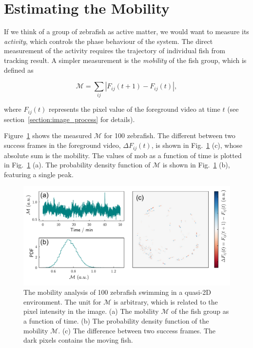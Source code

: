 \documentclass[11pt,twoside]{report}
\begin{document}
\section{Estimating the Mobility}


If we think of a group of zebrafish as active matter, we would want to measure its \emph{activity}, which controls the phase behaviour of the system. The direct measurement of the activity requires the trajectory of individual fish from tracking result. A simpler measurement is the \emph{mobility} of the fish group, which is defined as

\begin{equation}
	\mathcal{M} = \sum_{ij}\left\vert F_{ij}(t + 1) - F_{ij}(t) \right\vert,
\label{eq:mobility}
\end{equation}

\noindent where $F_{ij}(t)$ represents the pixel value of the foreground video at time $t$ (see section~\ref{section:image_process} for details).

Figure~\ref{fig:mobility} shows the measured $\mathcal{M}$ for 100 zebrafish. The different between two success frames in the foreground video, $\Delta F_{ij}(t)$, is shown in Fig.~\ref{fig:mobility} (c), whose absolute sum is the mobility. The values of \gls{mob} as a function of time is plotted in Fig.~\ref{fig:mobility} (a). The probability density function of $\mathcal{M}$ is shown in Fig.~\ref{fig:mobility} (b), featuring a single peak.

\begin{figure}
  \includegraphics[width=\linewidth]{mobility}
  \caption[The mobility analysis of 100 zebrafish]{
  The mobility analysis of 100 zebrafish swimming in a quasi-2D environment. The unit for $\mathcal{M}$ is arbitrary, which is related to the pixel intensity in the image.
  (a) The mobility $\mathcal{M}$ of the fish group as a function of time. 
  (b) The probability density function of the mobility $\mathcal{M}$.
  (c) The difference between two success frames. The dark pixels contains the moving fish.
  }
  \label{fig:mobility}
\end{figure}
\end{document}
